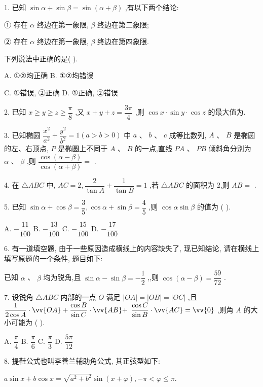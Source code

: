 1. 已知 $\sin \alpha  + \sin \beta  = \sin \left( {\alpha  + \beta }\right)$ ,有以下两个结论:

① 存在 $\alpha$ 终边在第一象限, $\beta$ 终边在第二象限;

② 存在 $\alpha$ 终边在第一象限, $\beta$ 终边在第四象限.

下列说法中正确的是(   ).

A. ①②均正确 B. ①②均错误

C. ①错误, ②正确 D. ①正确, ②错误

2. 已知 $x \geq  y \geq  z \geq  \dfrac{\pi }{8}$ ,又 $x + y + z = \dfrac{3\pi }{4}$ ,则 $\cos x \cdot  \sin y \cdot  \cos z$ 的最大值为\blkda{}.

3. 已知椭圆 $\dfrac{{x}^{2}}{{a}^{2}} + \dfrac{{y}^{2}}{{b}^{2}} = 1\left( {a > b > 0}\right)$ 中 $a$ 、 $b$ 、 $c$ 成等比数列, $A$ 、 $B$ 是椭圆的左、右顶点, $P$ 是椭圆上不同于 $A\text{ 、 }B$ 的一点,直线 ${PA}\text{ 、 }{PB}$ 倾斜角分别为 $\alpha \text{ 、 }\beta$ ,则 $\dfrac{\cos \left( {\alpha  - \beta }\right) }{\cos \left( {\alpha  + \beta }\right) } =$ \blkda{}.

4. 在 $\bigtriangleup  {ABC}$ 中, ${AC} = 2,\dfrac{2}{\tan A} + \dfrac{1}{\tan B} = 1$ ,若 $\bigtriangleup  {ABC}$ 的面积为 2,则 ${AB} =$ \blkda{}.

5. 已知 $\sin \alpha  + \cos \beta  = \dfrac{3}{5},\cos \alpha  + \sin \beta  = \dfrac{4}{5}$ ,则 $\cos \alpha \sin \beta$ 的值为 (   ).

A. $- \dfrac{11}{100}$ B. $- \dfrac{13}{100}$ C. $- \dfrac{15}{100}$ D. $- \dfrac{17}{100}$

6. 有一道填空题, 由于一些原因造成横线上的内容缺失了, 现已知结论, 请在横线上填写原题的一个条件, 题目如下:

已知 $\alpha$ 、 $\beta$ 均为锐角,且 $\sin \alpha  - \sin \beta  =  - \dfrac{1}{2}$ ,\blkda{},则 $\cos \left( {\alpha  - \beta }\right)  = \dfrac{59}{72}$ .

7. 设锐角 $\bigtriangleup {ABC}$ 内部的一点 $O$ 满足 $\left| {OA}\right|  = \left| {OB}\right|  = \left| {OC}\right|$ ,且 $\dfrac{1}{2\cos A} \cdot  \vv{OA} + \dfrac{\cos B}{\sin C} \cdot  \vv{AB} +$  $\dfrac{\cos C}{\sin B} \cdot  \vv{AC} = \vv{0}$ ,则角 $A$ 的大小可能为 (   ).

A. $\dfrac{\pi }{4}$ B. $\dfrac{\pi }{6}$ C. $\dfrac{\pi }{3}$ D. $\dfrac{5\pi }{12}$

8. 提鞋公式也叫李善兰辅助角公式, 其正弦型如下:

$
a\sin x + b\cos x = \sqrt{{a}^{2} + {b}^{2}}\sin \left( {x + \varphi }\right) , - \pi  < \varphi  \leq  \pi .
$

